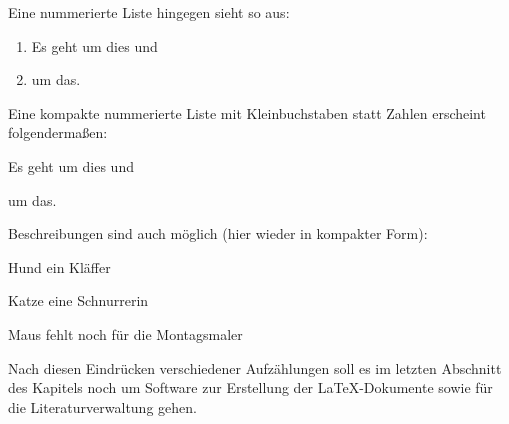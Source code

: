 Eine nummerierte Liste hingegen sieht so aus:
\begin{enumerate}
\item Es geht um dies und
\item um das.
\end{enumerate}

Eine kompakte nummerierte Liste mit Kleinbuchstaben statt Zahlen erscheint folgendermaßen:
\begin{compactenum}[\quad(a)]
\item Es geht um dies und
\item um das.
\end{compactenum}

Beschreibungen sind auch möglich (hier wieder in kompakter Form):
\begin{compactdesc}
\item[\quad Hund] ein Kläffer
\item[\quad Katze] eine Schnurrerin
\item[\quad Maus] fehlt noch für die Montagsmaler
\end{compactdesc}
%
Nach diesen Eindrücken verschiedener Aufzählungen soll es im letzten Abschnitt des Kapitels noch um
Software zur Erstellung der \LaTeX{}-Dokumente sowie für die Literaturverwaltung gehen.
%
